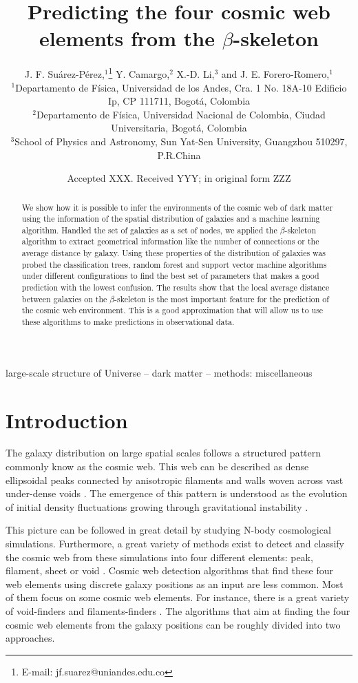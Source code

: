 \documentclass[usenatbib]{mnras}
\title[Cosmic web elements and the $\beta$-skeleton]{Predicting the four cosmic web
  elements from the $\beta$-skeleton}
\author[J. F. Su\'arez-P\'erez et al.]{
J. F. Su\'arez-P\'erez,$^{1}$\thanks{E-mail: jf.suarez@uniandes.edu.co}
Y. Camargo,$^{2}$ 
X.-D. Li,$^{3}$
and J. E. Forero-Romero,$^{1}$
\\
$^{1}$Departamento de F\'isica, Universidad de los Andes, Cra. 1 No. 18A-10 Edificio Ip, CP 111711, Bogot\'a, Colombia\\
$^{2}$Departamento de F\'isica, Universidad Nacional de Colombia, Ciudad Universitaria, Bogot\'a, Colombia\\
$^{3}$School of Physics and Astronomy, Sun Yat-Sen University, Guangzhou 510297, P.R.China\\
}
\date{Accepted XXX. Received YYY; in original form ZZZ}
\begin{document}
\label{firstpage}
\pagerange{\pageref{firstpage}--\pageref{lastpage}}
\maketitle

\begin{abstract}
We show how it is possible to infer the environments of the cosmic web
of dark matter using the information of the spatial distribution of
galaxies and a machine learning algorithm. 
Handled the set of galaxies as a set of nodes, we applied the
$\beta$-skeleton algorithm to extract geometrical information like the
number of connections or the average distance by galaxy. 
Using these properties of the distribution of galaxies was probed the
classification trees, random forest and support vector machine algorithms under different
configurations to find the best set of parameters that makes a good
prediction with the lowest confusion.
The results show that the local average distance between galaxies on
the $\beta$-skeleton is the most important feature for the prediction
of the cosmic web environment. 
This is a good approximation that will allow us to use these
algorithms to make predictions in observational data.  
\end{abstract}

\begin{keywords}
large-scale structure of Universe -- dark matter -- methods: miscellaneous
\end{keywords}


\section{Introduction}
The galaxy distribution on large spatial scales follows a structured 
pattern commonly know as the cosmic web. 
This web can be described as dense ellipsoidal peaks connected by
anisotropic filaments and walls woven across vast under-dense voids
\citep{Bond1996}. 
The emergence of this pattern is understood as the evolution of
initial density fluctuations growing through gravitational instability
\citep{ZelDovich1970,White1987}.

This picture can be followed in great detail by studying N-body
cosmological simulations.   
Furthermore, a great variety of methods exist to detect and
classify the cosmic web from these simulations into four different 
elements: peak, filament, sheet or void \citep{Libeskind2018}.
Cosmic web detection algorithms that find these four web
elements using discrete galaxy positions as an input are less
common.
Most of them focus on some cosmic web elements.
For instance, there is a great variety of void-finders
\citep{Platen2007,Neyrinck2008} and filaments-finders
\citep{Novikov2003,Zhang2009,Sousbie2010,Chen2015,Luber2019}.   
The algorithms that aim at finding the four cosmic web elements from
the galaxy positions can be roughly divided into two approaches.
\end{document}
